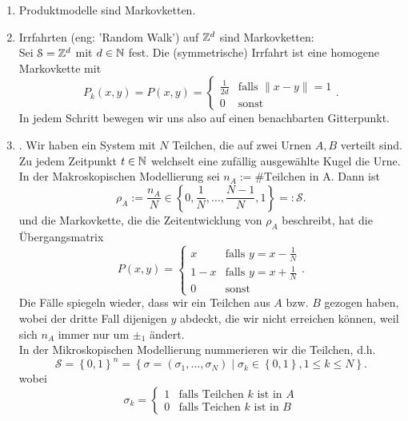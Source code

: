 \begin{example}
    \begin{enumerate}[label=\protect\circled{\alph*}]
        \item Produktmodelle sind Markovketten.
        \item Irrfahrten (eng: 'Random Walk') auf $\mathbb{Z}^d$ sind Markovketten:\\
            Sei $\mathcal{S} = \mathbb{Z}^d$ mit $d\in \mathbb{N}$ fest. Die (symmetrische) Irrfahrt ist eine homogene Markovkette mit 
            \[
                P_k(x,y) = P(x,y) = \begin{cases}
                    \frac{1}{2d} & \text{falls } \lVert x-y \rVert =1 \\
                                0 & \text{sonst}
                \end{cases}
            .\] 
In jedem Schritt bewegen wir uns also auf einen benachbarten Gitterpunkt.
\item {}. Wir haben ein System mit $N$ Teilchen, die auf zwei Urnen  $A,B$ verteilt sind. Zu jedem Zeitpunkt  $t\in \mathbb{N}$ welchselt eine zufällig ausgewählte Kugel die Urne. \\
    In der Makroskopischen Modellierung sei $n_A := \# \text{Teilchen in A}$. Dann ist
    \[
    \rho_A := \frac{n_A}{N}\in \left \{0,\frac{1}{N}, \ldots, \frac{N-1}{N},1\right\}  = : \mathcal{S}
    .\] 
    und die Markovkette, die die Zeitentwicklung von $\rho_A$ beschreibt, hat die Übergangsmatrix
     \[
         P(x,y) = \begin{cases}
             x & \text{falls } y = x-\frac{1}{N} \\
             1-x & \text{falls } y = x+\frac{1}{N} \\
             0 & \text{sonst}
         \end{cases}
    .\] 
    Die Fälle spiegeln wieder, dass wir ein Teilchen aus $A$ bzw.  $B$ gezogen haben, wobei der dritte Fall dijenigen  $y$ abdeckt, die wir nicht erreichen können, weil sich  $n_A$ immer nur um $\pm_1$ ändert. \\
    In der Mikroskopischen Modellierung nummerieren wir die Teilchen, d.h.
     \[
         \mathcal{S} = \left \{0,1\right\} ^n = \left \{σ = (σ_1, \ldots,σ_N) \mid  σ_k \in \left \{0,1\right\} , 1\leq k\leq N\right\} 
    .\] 
    wobei
    \[
    σ_k = \begin{cases}
        1 & \text{falls Teilchen } k \text{ ist in $A$}\\
        0 & \text{falls Teichen $k$ ist in  $B$}

\end{cases}\]
\end{enumerate}
\end{example}
